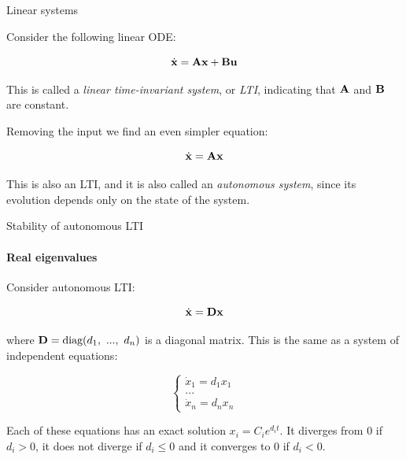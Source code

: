 \documentclass{beamer}
\begin{document}
\begin{frame}{Linear systems}
\begin{flushleft}

Consider the following linear ODE:

\begin{equation}
    \dot{\mathbf{x}} = \mathbf{A} \mathbf{x} + \mathbf{B} \mathbf{u}
\end{equation}

This is called a \emph{linear time-invariant system}, or \emph{LTI}, indicating that $\mathbf{A}$ and $\mathbf{B}$ are constant.

\bigskip

Removing the input we find an even simpler equation:

\begin{equation}
    \dot{\mathbf{x}} = \mathbf{A} \mathbf{x}
\end{equation}

This is also an LTI, and it is also called an \emph{autonomous system}, since its evolution depends only on the state of the system.

\end{flushleft}
\end{frame}




\begin{frame}{Stability of autonomous LTI}
	\framesubtitle{Real eigenvalues}
	\begin{flushleft}
		
		Consider autonomous LTI:
		
		\begin{equation}
			\dot{\mathbf{x}} = \mathbf{D} \mathbf{x}
		\end{equation}
		
		where $\bo{D} = \text{diag}(d_1, \ ..., \ d_n)$ is a diagonal matrix. This is the same as a system of independent equations: 
		
		\begin{equation}
			\begin{cases}
				\dot{x}_1 = d_1 x_1 \\
				... \\
				\dot{x}_n = d_n x_n
			\end{cases}
		\end{equation}		
		
		Each of these equations has an exact solution $ x_i = C_i e^{d_i t}$. It diverges from 0 if $d_i > 0$, it does not diverge if $d_i \leq 0$ and it converges to 0 if $d_i < 0$.
		
	\end{flushleft}
\end{frame}
\end{document}

